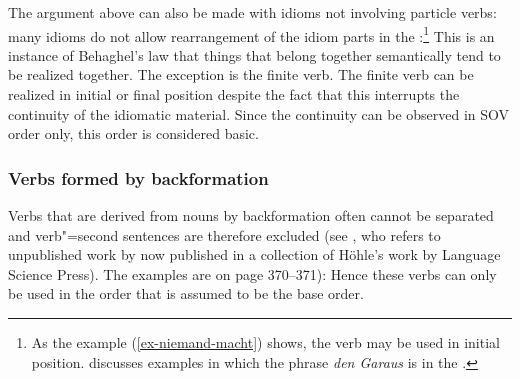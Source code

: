 The argument above can also be made with idioms not involving particle verbs: many idioms do not allow
rearrangement of the idiom parts in the \mf:\footnote{
  As the example (\ref{ex-niemand-macht}) shows, the verb may be used in initial position. \citet[]{MuellerLehrbuch3} discusses examples in which the phrase \emph{den Garaus} is in the \vf.
}
\eal
{}
\zl
This is an instance of Behaghel's law \citeyearpar{Behaghel32-u}
that things that belong together semantically tend to be realized together. The exception is the
finite verb. The finite verb can be realized in initial or final position despite the fact that this
interrupts the continuity of the idiomatic material. Since the continuity can be observed in SOV
order only, this order is considered basic.

\subsubsection{Verbs formed by backformation}

\largerpage[2]
Verbs that are derived from nouns by backformation often cannot be separated and verb"=second
sentences are therefore excluded (see \citealt[]{Haider93a}, who refers to unpublished work
by \citealt{Hoehle91b} now published in a collection of Höhle's work by Language Science Press). The
examples are on page 370--371):
\eal
\label{ex-uraufführen}
\zl
Hence these verbs can only be used in the order that is assumed to be the base order.%

